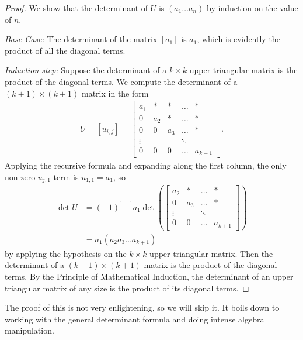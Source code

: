 \begin{proof}
	We show that the determinant of $U$ is $(a_1\ldots a_n)$ by induction on the value of $n$.

	\textit{Base Case:} The determinant of the matrix $[a_1]$ is $a_1$, which is evidently the product of all the diagonal terms.
	
	\textit{Induction step:} Suppose the determinant of a $k\times k$ upper triangular matrix is the product of the diagonal terms. We compute the determinant of a $(k+1)\times (k+1)$ matrix in the form
	\begin{align*}
		U=[u_{i,j}]=\begin{bmatrix}
			a_1& *& *&\ldots& *\\
			0 & a_2 & *& \ldots&*\\
			0&0&a_3& \ldots & * \\
			\vdots & & &\ddots& \\
			0 & 0 & 0 & \ldots & a_{k+1}
		\end{bmatrix}.
	\end{align*}
	Applying the recursive formula and expanding along the first column, the only non-zero $u_{j,1}$ term is $u_{1,1}=a_1$, so \begin{align*}
		\det U &= (-1)^{1+1} a_1 \det \left( \begin{bmatrix}
			a_2 & *& \ldots&*\\
		   0&a_3& \ldots & * \\
		   \vdots  & &\ddots& \\
			0 & 0 & \ldots & a_{k+1}
	   \end{bmatrix}\right)\\
	   &= a_1 (a_2 a_3\ldots a_{k+1}) 
	\end{align*}
	by applying the hypothesis on the $k\times k$ upper triangular matrix. Then the determinant of a $(k+1)\times (k+1)$ matrix is the product of the diagonal terms. 
	By the Principle of Mathematical Induction, the determinant of an upper triangular matrix of any size is the product of its diagonal terms.
\end{proof}


The proof of this is not very enlightening, so we will skip it. It boils down to working with the general determinant formula and doing intense algebra manipulation.

